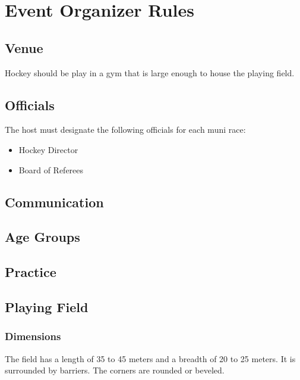\chapter{Event Organizer Rules}

\section{Venue}

Hockey should be play in a gym that is large enough to house the playing field.
\section{Officials}

The host must designate the following officials for each muni race:
\begin{itemize}
\item Hockey Director
\item Board of Referees
\end{itemize}

\begin{comment-2016}

\section{Communication}

\section{Age Groups}

\section{Practice}

\end{comment-2016}

\section{Playing Field}

\subsection{Dimensions}



The field has a length of 35 to 45 meters and a breadth of 20 to 25 meters.
It is surrounded by barriers.
The corners are rounded or beveled.

